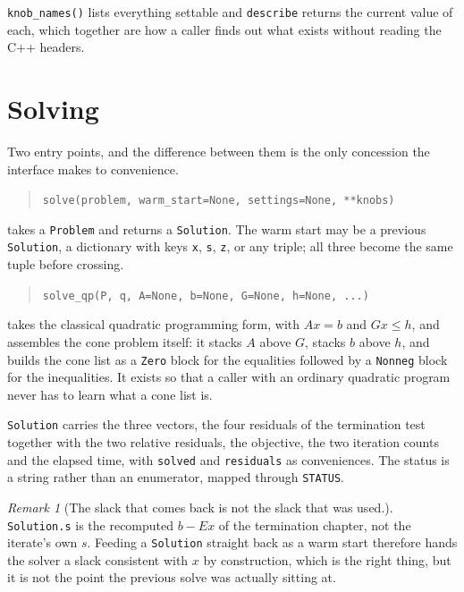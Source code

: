 \documentclass[a4paper,11pt]{book}
\theoremstyle{plain}
\theoremstyle{definition}
\theoremstyle{remark}
\newtheorem{remark}[theorem]{Remark}
\numberwithin{equation}{chapter}
\numberwithin{algorithm}{chapter}
\begin{document}
	\texttt{knob\_names()} lists everything settable and \texttt{describe} returns
	the current value of each, which together are how a caller finds out what
	exists without reading the C++ headers.

	\section{Solving}

	Two entry points, and the difference between them is the only concession the
	interface makes to convenience.

	\begin{quote}
		\texttt{solve(problem, warm\_start=None, settings=None, **knobs)}
	\end{quote}

	takes a \texttt{Problem} and returns a \texttt{Solution}. The warm start may
	be a previous \texttt{Solution}, a dictionary with keys \texttt{x},
	\texttt{s}, \texttt{z}, or any triple; all three become the same tuple before
	crossing.

	\begin{quote}
		\texttt{solve\_qp(P, q, A=None, b=None, G=None, h=None, ...)}
	\end{quote}

	takes the classical quadratic programming form, with $Ax=b$ and $Gx\leq h$,
	and assembles the cone problem itself: it stacks $A$ above $G$, stacks $b$
	above $h$, and builds the cone list as a \texttt{Zero} block for the
	equalities followed by a \texttt{Nonneg} block for the inequalities. It exists
	so that a caller with an ordinary quadratic program never has to learn what a
	cone list is.

	\texttt{Solution} carries the three vectors, the four residuals of the
	termination test together with the two relative residuals, the objective, the
	two iteration counts and the elapsed time, with \texttt{solved} and \texttt{residuals} as conveniences. The status
	is a string rather than an enumerator, mapped through \texttt{STATUS}.

	\begin{remark}[The slack that comes back is not the slack that was used.]
		\texttt{Solution.s} is the recomputed $b-Ex$ of the termination chapter,
		not the iterate's own $s$. Feeding a \texttt{Solution} straight back as a
		warm start therefore hands the solver a slack consistent with $x$ by
		construction, which is the right thing, but it is not the point the previous
		solve was actually sitting at.
	\end{remark}
\end{document}
